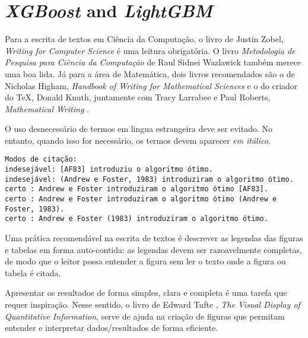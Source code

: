 \section{\textit{XGBoost} and \textit{LightGBM}}


Para a escrita de textos em Ciência da Computação, o livro de Justin Zobel, 
\emph{Writing for Computer Science} \cite{zobel:04} é uma leitura obrigatória. 
O livro \emph{Metodologia de Pesquisa para Ciência da Computação} de 
Raul Sidnei Wazlawick \cite{waz:09} também merece uma boa lida.
Já para a área de Matemática, dois livros recomendados são o de Nicholas Higham,
\emph{Handbook of Writing for Mathematical Sciences} \cite{Higham:98} e o do criador
do \TeX, Donald Knuth, juntamente com Tracy Larrabee e Paul Roberts, 
\emph{Mathematical Writing} \cite{Knuth:96}.

O uso desnecessário de termos em lingua estrangeira deve ser evitado. No entanto,
quando isso for necessário, os termos devem aparecer \emph{em itálico}.

\begin{small}
\begin{verbatim}
Modos de citação:
indesejável: [AF83] introduziu o algoritmo ótimo.
indesejável: (Andrew e Foster, 1983) introduziram o algoritmo ótimo.
certo : Andrew e Foster introduziram o algoritmo ótimo [AF83].
certo : Andrew e Foster introduziram o algoritmo ótimo (Andrew e Foster, 1983).
certo : Andrew e Foster (1983) introduziram o algoritmo ótimo.
\end{verbatim}
\end{small}

Uma prática recomendável na escrita de textos é descrever as legendas das
figuras e tabelas em forma auto-contida: as legendas devem ser razoavelmente
completas, de modo que o leitor possa entender a figura sem ler o texto onde a
figura ou tabela é citada.  

Apresentar os resultados de forma simples, clara e completa é uma tarefa que
requer inspiração. Nesse sentido, o livro de Edward Tufte \cite{tufte01:visualDisplay},
\emph{The Visual Display of Quantitative Information}, serve de ajuda na 
criação de figuras que permitam entender e interpretar dados/resultados de forma
eficiente.




